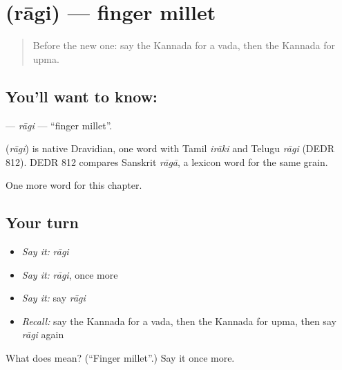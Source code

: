\section[\texorpdfstring{\kn{ರಾಗಿ} (rāgi)}{ರಾಗಿ (rāgi)}]{ (rāgi) — finger millet}

\label{lesson:KA-C125-ragi}



\begin{quote}
Before the new one: say the Kannada for a vada, then the Kannada for upma.
\end{quote}

\subsection*{You'll want to know: }
\textbf{} — \emph{rāgi} — \textquotedblleft{}finger millet\textquotedblright{}.

\begin{cousinweb}
\textbf{} (\emph{rāgi}) is native Dravidian, one word with Tamil \emph{irāki} and Telugu \emph{rāgi} (DEDR 812). DEDR 812 compares Sanskrit \emph{rāgā}, a lexicon word for the same grain.
\end{cousinweb}

\begin{grammarlens}[title={What you've built}]
One more word for this chapter.
\end{grammarlens}

\subsection*{Your turn}
\begin{itemize}
\raggedright
  \item \emph{Say it:} \emph{rāgi}
  \item \emph{Say it:} \emph{rāgi}, once more
  \item \emph{Say it:} say \emph{rāgi}
  \item \emph{Recall:} say the Kannada for a vada, then the Kannada for upma, then say \emph{rāgi} again
\end{itemize}

\begin{tcolorbox}[breakable,colback=teal!4,colframe=teal!35!black,title={Before you move on}]
What does  mean? (\textquotedblleft{}Finger millet\textquotedblright{}.) Say it once more.
\end{tcolorbox}
